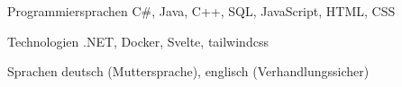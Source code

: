 
\begin{cvskills}
  \cvskill
  {Programmiersprachen} %
  {C\#, Java, C++, SQL, JavaScript, HTML, CSS} %

  \cvskill
  {Technologien} %
  {.NET, Docker, Svelte, tailwindcss} %

  \cvskill
  {Sprachen} %
  {deutsch (Muttersprache), englisch (Verhandlungssicher)} %
\end{cvskills}
